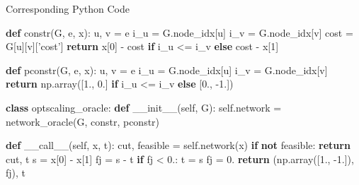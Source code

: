 \documentclass[
  ignorenonframetext,
  aspectratio=169,
  serif,onlymath]{beamer}
\newenvironment{Shaded}{}{}
\newcommand{\ControlFlowTok}[1]{\textcolor[rgb]{0.00,0.44,0.13}{\textbf{#1}}}
\newcommand{\DecValTok}[1]{\textcolor[rgb]{0.25,0.63,0.44}{#1}}
\newcommand{\FloatTok}[1]{\textcolor[rgb]{0.25,0.63,0.44}{#1}}
\newcommand{\FunctionTok}[1]{\textcolor[rgb]{0.02,0.16,0.49}{#1}}
\newcommand{\KeywordTok}[1]{\textcolor[rgb]{0.00,0.44,0.13}{\textbf{#1}}}
\newcommand{\NormalTok}[1]{#1}
\newcommand{\OperatorTok}[1]{\textcolor[rgb]{0.40,0.40,0.40}{#1}}
\newcommand{\StringTok}[1]{\textcolor[rgb]{0.25,0.44,0.63}{#1}}
\newcommand{\VariableTok}[1]{\textcolor[rgb]{0.10,0.09,0.49}{#1}}
\begin{document}
\begin{frame}[fragile]{Corresponding Python Code}
\protect\hypertarget{corresponding-python-code-1}{}

\scriptsize

\begin{Shaded}
\begin{Highlighting}[]
\KeywordTok{def}\NormalTok{ constr(G, e, x):}
\NormalTok{    u, v }\OperatorTok{=}\NormalTok{ e}
\NormalTok{    i_u }\OperatorTok{=}\NormalTok{ G.node_idx[u]}
\NormalTok{    i_v }\OperatorTok{=}\NormalTok{ G.node_idx[v]}
\NormalTok{    cost }\OperatorTok{=}\NormalTok{ G[u][v][}\StringTok{'cost'}\NormalTok{]}
    \ControlFlowTok{return}\NormalTok{ x[}\DecValTok{0}\NormalTok{] }\OperatorTok{-}\NormalTok{ cost }\ControlFlowTok{if}\NormalTok{ i_u }\OperatorTok{<=}\NormalTok{ i_v }\ControlFlowTok{else}\NormalTok{ cost }\OperatorTok{-}\NormalTok{ x[}\DecValTok{1}\NormalTok{]}

\KeywordTok{def}\NormalTok{ pconstr(G, e, x):}
\NormalTok{    u, v }\OperatorTok{=}\NormalTok{ e}
\NormalTok{    i_u }\OperatorTok{=}\NormalTok{ G.node_idx[u]}
\NormalTok{    i_v }\OperatorTok{=}\NormalTok{ G.node_idx[v]}
    \ControlFlowTok{return}\NormalTok{ np.array([}\FloatTok{1.}\NormalTok{,  }\FloatTok{0.}\NormalTok{] }\ControlFlowTok{if}\NormalTok{ i_u }\OperatorTok{<=}\NormalTok{ i_v }\ControlFlowTok{else}\NormalTok{ [}\FloatTok{0.}\NormalTok{, }\FloatTok{-1.}\NormalTok{])}

\KeywordTok{class}\NormalTok{ optscaling_oracle:}
    \KeywordTok{def} \FunctionTok{__init__}\NormalTok{(}\VariableTok{self}\NormalTok{, G):}
        \VariableTok{self}\NormalTok{.network }\OperatorTok{=}\NormalTok{ network_oracle(G, constr, pconstr)}

    \KeywordTok{def} \FunctionTok{__call__}\NormalTok{(}\VariableTok{self}\NormalTok{, x, t):}
\NormalTok{        cut, feasible }\OperatorTok{=} \VariableTok{self}\NormalTok{.network(x)}
        \ControlFlowTok{if} \KeywordTok{not}\NormalTok{ feasible: }\ControlFlowTok{return}\NormalTok{ cut, t}
\NormalTok{        s }\OperatorTok{=}\NormalTok{ x[}\DecValTok{0}\NormalTok{] }\OperatorTok{-}\NormalTok{ x[}\DecValTok{1}\NormalTok{]}
\NormalTok{        fj }\OperatorTok{=}\NormalTok{ s }\OperatorTok{-}\NormalTok{ t}
        \ControlFlowTok{if}\NormalTok{ fj }\OperatorTok{<} \FloatTok{0.}\NormalTok{:}
\NormalTok{            t }\OperatorTok{=}\NormalTok{ s}
\NormalTok{            fj }\OperatorTok{=} \FloatTok{0.}
        \ControlFlowTok{return}\NormalTok{ (np.array([}\FloatTok{1.}\NormalTok{, }\FloatTok{-1.}\NormalTok{]), fj), t}
\end{Highlighting}
\end{Shaded}

\end{frame}
\end{document}
